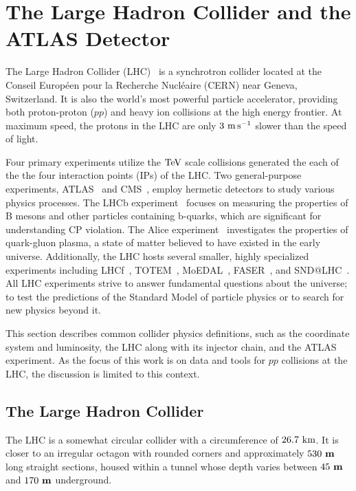 
\chapter{The Large Hadron Collider and the ATLAS Detector}
\label{ch:lhc_atlas_detector}

The Large Hadron Collider (LHC)~\cite{LHCMachine,LHC1,LHC2, LHC3} is a synchrotron collider located at the Conseil Européen pour la Recherche Nucléaire (CERN) near Geneva, Switzerland.
It is also the world's most powerful particle accelerator, providing both proton-proton ($pp$) and heavy ion collisions at the high energy frontier.
At maximum speed, the protons in the LHC are only $3~\mps$ slower than the speed of light.

Four primary experiments utilize the $\TeV$ scale collisions generated the each of the the four interaction points (IPs) of the LHC.
Two general-purpose experiments, ATLAS~\cite{ATLAS} and CMS~\cite{CMS}, employ hermetic detectors to study various physics processes.
The LHCb experiment~\cite{LHCb} focuses on measuring the properties of B mesons and other particles containing b-quarks, which are significant for understanding CP violation.
The Alice experiment~\cite{ALICE} investigates the properties of quark-gluon plasma, a state of matter believed to have existed in the early universe.
Additionally, the LHC hosts several smaller, highly specialized experiments including LHCf~\cite{LHCf}, TOTEM~\cite{TOTEM}, MoEDAL~\cite{MoEDAL}, FASER~\cite{FASER}, and SND@LHC~\cite{SNDLHC}.
All LHC experiments strive to answer fundamental questions about the universe; to test the predictions of the Standard Model of particle physics or to search for new physics beyond it.

This section describes common collider physics definitions, such as the coordinate system and luminosity,
the LHC along with its injector chain, and the ATLAS experiment.
As the focus of this work is on data and tools for $pp$ collisions at the LHC, the discussion is limited to this context.

\section{The Large Hadron Collider}

The LHC is a somewhat circular collider with a circumference of $26.7~\km$.
It is closer to an irregular octagon with rounded corners and approximately $ 530~\mathbf{m} $ long straight sections, housed within a tunnel whose depth varies between $45~\mathbf{m}$ and $170~\mathbf{m}$ underground.

